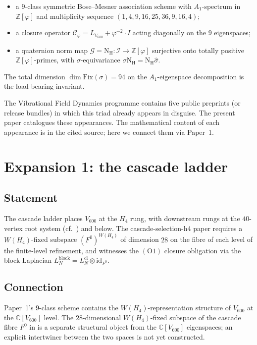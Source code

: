 \documentclass[11pt,a4paper]{article}
\theoremstyle{definition}
\theoremstyle{remark}
\newcommand{\Z}{\mathbb{Z}}
\newcommand{\C}{\mathbb{C}}
\newcommand{\II}{\mathcal{I}}
\newcommand{\GG}{\mathcal{G}}
\newcommand{\CC}{\mathcal{C}}
\newcommand{\NH}{\mathrm{N}_{\mathrm{H}}}
\newcommand{\Zphi}{\Z[\varphi]}
\newcommand{\WHfour}{W(H_4)}
\begin{document}
\begin{itemize}
  \item a $9$-class symmetric Bose--Mesner association scheme with
    $A_1$-spectrum in $\Zphi$ and multiplicity sequence
    $(1,4,9,16,25,36,9,16,4)$;
  \item a closure operator $\CC_\varphi = L_{V_{600}} + \varphi^{-2}\!\cdot\! I$
    acting diagonally on the $9$ eigenspaces;
  \item a quaternion norm map $\GG = \NH : \II \to \Zphi$ surjective onto
    totally positive $\Zphi$-primes, with $\sigma$-equivariance
    $\sigma \NH = \NH \widehat\sigma$.
\end{itemize}

The total dimension $\dim \mathrm{Fix}(\sigma) = 94$ on the $A_1$-eigenspace
decomposition is the load-bearing invariant.

The Vibrational Field Dynamics programme contains five public preprints (or
release bundles) in which this triad already appears in disguise. The present
paper catalogues these appearances. The mathematical content of each
appearance is in the cited source; here we connect them via Paper~1.

\bigskip

\section{Expansion 1: the cascade ladder}\label{sec:cascade}

\subsection*{Statement}

The cascade ladder \cite{cascadeDerivation,cascadeRefinementPapers}
places $V_{600}$ at the $H_4$ rung, with downstream rungs at the
$40$-vertex root system (cf.\ \cite{cascadeRefinementPapers}) and below.
The cascade-selection-h4 paper \cite{cascadeSelectionH4} requires a
$\WHfour$-fixed subspace $(F^0)^{\WHfour}$ of dimension $28$ on the
fibre of each level of the finite-level refinement, and witnesses the
$(\mathrm{O}1)$ closure obligation via the block Laplacian
$L_N^\mathrm{block} = L_N^\mathrm{cl} \otimes \mathrm{id}_{F^0}$.

\subsection*{Connection}

Paper~1's $9$-class scheme contains the $\WHfour$-representation structure
of $V_{600}$ at the $\C[V_{600}]$ level. The $28$-dimensional
$\WHfour$-fixed subspace of the cascade fibre $F^0$ in
\cite{cascadeSelectionH4} is a separate structural object from the
$\C[V_{600}]$ eigenspaces; an explicit intertwiner between the two
spaces is not yet constructed.
\end{document}
